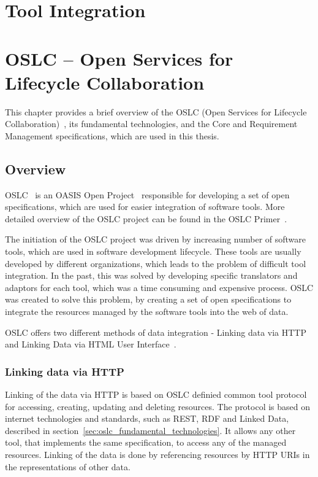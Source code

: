 
\chapter{Tool Integration}


\chapter{OSLC -- Open Services for Lifecycle Collaboration}
This chapter provides a brief overview of the OSLC (Open Services for Lifecycle Collaboration) \cite{oslc}, its fundamental technologies, and the Core and Requirement Management specifications, which are used in this thesis.

\section{Overview}
OSLC \cite{oslc} is an OASIS Open Project \cite{oasis_open} responsible for developing a set of open specifications, which are used for easier integration of software tools. More detailed overview of the OSLC project can be found in the OSLC Primer \cite{oslc_primer}.

The initiation of the OSLC project was driven by increasing number of software tools, which are used in software development lifecycle. These tools are usually developed by different organizations, which leads to the problem of difficult tool integration. In the past, this was solved by developing specific translators and adaptors for each tool, which was a time consuming and expensive process. OSLC was created to solve this problem, by creating a set of open specifications to integrate the resources managed by the software tools into the web of data.

OSLC offers two different methods of data integration - Linking data via HTTP and Linking Data via HTML User Interface \cite{oslc_primary_integration_techniques}.

\subsection*{Linking data via HTTP}
Linking of the data via HTTP is based on OSLC definied common tool protocol for accessing, creating, updating and deleting resources. The protocol is based on internet technologies and standards, such as REST, RDF and Linked Data, described in section \ref{sec:oslc_fundamental_technologies}. It allows any other tool, that implements the same specification, to access any of the managed resources. Linking of the data is done by referencing resources by HTTP URIs in the representations of other data.


